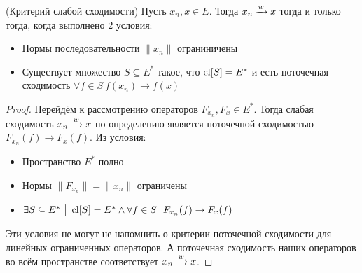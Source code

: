 \begin{theorem} (Критерий слабой сходимости)
	Пусть $x_n, x \in E$. Тогда $x_n \xrightarrow{w} x$ тогда и только тогда, когда выполнено 2 условия:
	\begin{itemize}
		\item Нормы последовательности $\|x_n\|$ ограниничены
		
		\item Существует множество $S \subseteq E^*$ такое, что $\operatorname{cl} [S] = E^*$ и есть поточечная сходимость $\forall f \in S\ f(x_n) \to f(x)$
	\end{itemize}
\end{theorem}

\begin{proof}
	Перейдём к рассмотрению операторов $F_{x_n}, F_x \in E^*$. Тогда слабая сходимость $x_n \xrightarrow{w} x$ по определению является поточечной сходимостью $F_{x_n}(f) \to F_x(f)$. Из условия:
	\begin{itemize}
		\item Пространство $E^*$ полно
		
		\item Нормы $\|F_{x_n}\| = \|x_n\|$ ограничены
		
		\item $\exists S \subseteq E^* \ \big|\  \operatorname{cl} [S] = E^* \wedge \forall f \in S\ \ F_{x_n}(f) \to F_x(f)$
	\end{itemize}
	Эти условия не могут не напомнить о критерии поточечной сходимости для линейных ограниченных операторов. А поточечная сходимость наших операторов во всём пространстве соответствует $x_n \xrightarrow{w} x$.
\end{proof}

